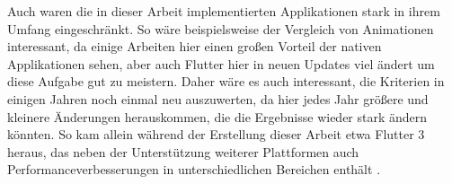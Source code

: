 Auch waren die in dieser Arbeit implementierten Applikationen stark in ihrem Umfang eingeschränkt. So wäre beispielsweise der Vergleich von Animationen interessant, da einige Arbeiten hier einen großen Vorteil der nativen Applikationen sehen, aber auch Flutter hier in neuen Updates viel ändert um diese Aufgabe gut zu meistern. Daher wäre es auch interessant, die Kriterien in einigen Jahren noch einmal neu auszuwerten, da hier jedes Jahr größere und kleinere Änderungen herauskommen, die die Ergebnisse wieder stark ändern könnten. So kam allein während der Erstellung dieser Arbeit etwa Flutter 3 heraus, das neben der Unterstützung weiterer Plattformen auch Performanceverbesserungen in unterschiedlichen Bereichen enthält \cite{flutter3}. 
